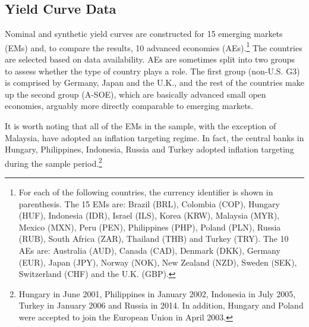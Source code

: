 {\subsection{Yield Curve Data}
\iftoggle{toclinks}{\gototoc}{} %

Nominal and synthetic yield curves are constructed for 15 emerging markets (EMs) and, to compare the results, 10 advanced economies (AEs).\footnote{ For each of the following countries, the currency identifier is shown in parenthesis. The 15 EMs are: Brazil (BRL), Colombia (COP), Hungary (HUF), Indonesia (IDR), Israel (ILS), Korea (KRW), Malaysia (MYR), Mexico (MXN), Peru (PEN), Philippines (PHP), Poland (PLN), Russia (RUB), South Africa (ZAR), Thailand (THB) and Turkey (TRY). The 10 AEs are: Australia (AUD), Canada (CAD), Denmark (DKK), Germany (EUR), Japan (JPY), Norway (NOK), New Zealand (NZD), Sweden (SEK), Switzerland (CHF) and the U.K. (GBP).} 
The countries are selected based on data availability. 
AEs are sometimes split into two groups to assess whether the type of country plays a role. 
The first group (non-U.S. G3) is comprised by Germany, Japan and the U.K., and the rest of the countries make up the second group (A-SOE), which are basically advanced small open economies, arguably more directly comparable to emerging markets.

It is worth noting that all of the EMs in the sample, with the exception of Malaysia, have adopted an inflation targeting regime.
In fact, the central banks in Hungary, Philippines, Indonesia, Russia and Turkey adopted inflation targeting during the sample period.\footnote{ Hungary in June 2001, Philippines in January 2002, Indonesia in July 2005, Turkey in January 2006 and Russia in 2014. In addition, Hungary and Poland were accepted to join the European Union in April 2003.}

}

